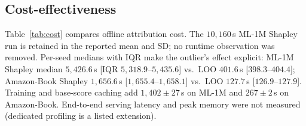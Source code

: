\documentclass[pdflatex,sn-mathphys-num]{sn-jnl}
\begin{document}
\begin{table}[t]
\caption{Procedure sensitivity for the Shapley--LOO contrast (joint seed-mean user differences). ``Legacy'' = within-seed user bootstrap of the original protocol, re-run at $B=10{,}000$ for comparability; ``---'' = procedure not applicable to that study version. Conclusions are robust for the controls; the Shapley-vs-LOO verdict on ML-1M is procedure-dependent and is reported as such.}\label{tab:robustness}
\centering
\scriptsize
{}
\end{table}

\subsection{Cost-effectiveness}\label{subsec:cost}

Table~\ref{tab:cost} compares offline attribution cost. The $10{,}160$\,s ML-1M Shapley run is retained in the reported mean and SD; no runtime observation was removed. Per-seed medians with IQR make the outlier's effect explicit: ML-1M Shapley median $5{,}426.6$\,s [IQR $5{,}318.9$--$5{,}435.6$] vs.\ LOO $401.6$\,s [$398.3$--$404.4$]; Amazon-Book Shapley $1{,}656.6$\,s [$1{,}655.4$--$1{,}658.1$] vs.\ LOO $127.7$\,s [$126.9$--$127.9$]. Training and base-score caching add $1{,}402\pm27$\,s on ML-1M and $267\pm2$\,s on Amazon-Book. End-to-end serving latency and peak memory were not measured (dedicated profiling is a listed extension).
\end{document}
